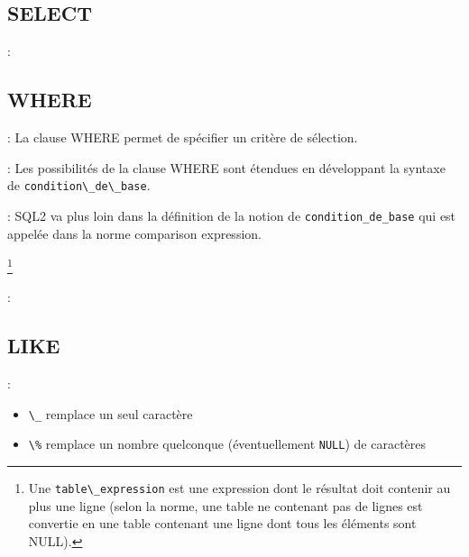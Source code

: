 \documentclass[10pt]{beamer}
\begin{document}
\subsection{SELECT}
\begin{frame}{\secname : \subsecname}
    
\end{frame}

\subsection{WHERE}
\begin{frame}{\secname : \subsecname}
    La clause WHERE permet de spécifier un critère de sélection.
    
\end{frame}

\begin{frame}{\secname : \subsecname}
    Les possibilités de la clause WHERE sont étendues en développant la syntaxe de \lstinline[language=bnf]!condition\_de\_base!.
    
\end{frame}

\begin{frame}{\secname : \subsecname}
    SQL2 va plus loin dans la définition de la notion de \lstinline[language=plsql]!condition_de_base! qui est appelée dans la norme comparison expression.
    
    \footnote{Une \lstinline[language=plsql]!table\_expression! est une expression dont le résultat doit contenir au plus une ligne (selon la norme, une table ne contenant pas de lignes est convertie en une table contenant une ligne dont tous les éléments sont NULL).}
\end{frame}

\begin{frame}{\secname : \subsecname}
    
\end{frame}

\subsection{LIKE}
\begin{frame}{\secname : \subsecname}
    
    \begin{itemize}
        \item \lstinline[language=plsql]!\_! remplace un seul caractère
        \item \lstinline[language=plsql]!\%! remplace un nombre quelconque (éventuellement \lstinline[language=plsql]!NULL!) de caractères
    \end{itemize}
\end{frame}
\end{document}
